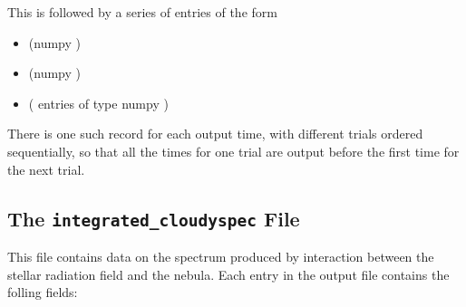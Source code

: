 \documentclass[letterpaper,10pt,english]{sphinxmanual}
\begin{document}
This is followed by a series of entries of the form
\begin{itemize}
\item {} 
 (numpy )

\item {} 
 (numpy )

\item {} 
 ( entries of type numpy )

\end{itemize}

There is one such record for each output time, with different trials
ordered sequentially, so that all the times for one trial are output
before the first time for the next trial.


\subsection{The \texttt{integrated\_cloudyspec} File}
\label{cloudy:the-integrated-cloudyspec-file}\label{cloudy:sssec-int-cloudyspec-file}
This file contains data on the spectrum produced by interaction
between the stellar radiation field and the nebula. Each entry in the
output file contains the folling fields:
\end{document}

